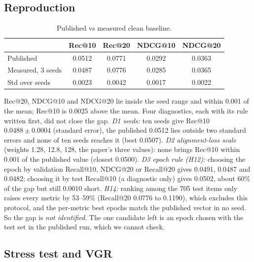\documentclass[conference]{IEEEtran}
\begin{document}
\subsection{Reproduction}

\begin{table}[!t]
\centering\footnotesize
\caption{Published vs measured clean baseline.}
\label{tab:repro}
\begin{tabular}{@{}lcccc@{}}
\toprule
 & Rec@10 & Rec@20 & NDCG@10 & NDCG@20 \\
\midrule
Published & 0.0512 & 0.0771 & 0.0292 & 0.0363 \\
Measured, 3 seeds & 0.0487 & 0.0776 & 0.0285 & 0.0365 \\
Std over seeds & 0.0023 & 0.0042 & 0.0017 & 0.0022 \\
\bottomrule
\end{tabular}
\end{table}

Rec@20, NDCG@10 and NDCG@20 lie inside the seed range and within 0.001 of the mean; Rec@10 is 0.0025 above the mean. Four diagnostics, each with its rule written first, did not close the gap. \emph{D1 seeds:} ten seeds give Rec@10 $0.0488\pm0.0004$ (standard error), the published 0.0512 lies outside two standard errors and none of ten seeds reaches it (best 0.0507). \emph{D2 alignment-loss scale} (weights 1.28, 12.8, 128, the paper's three values): none brings Rec@10 within 0.001 of the published value (closest 0.0500). \emph{D3 epoch rule (H12):} choosing the epoch by validation Recall@10, NDCG@20 or Recall@20 gives 0.0491, 0.0487 and 0.0482; choosing it by test Recall@10 (a diagnostic only) gives 0.0502, about 60\% of the gap but still 0.0010 short. \emph{H14:} ranking among the 705 test items only raises every metric by 53--59\% (Recall@20 0.0776 to 0.1190), which excludes this protocol, and the per-metric best epochs match the published vector in no seed. So the gap is \emph{not identified}. The one candidate left is an epoch chosen with the test set in the published run, which we cannot check.

\subsection{Stress test and VGR}
\end{document}
